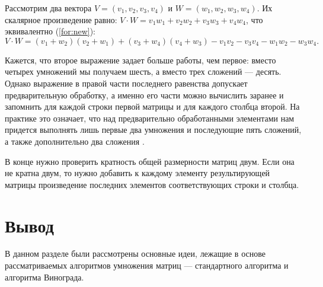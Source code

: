 Рассмотрим два вектора $V = (v_1, v_2, v_3, v_4)$ и $W = (w_1, w_2, w_3, w_4)$.
Их скалярное произведение равно: $V \cdot W = v_1w_1 + v_2w_2 + v_3w_3 + v_4w_4$, что эквивалентно (\ref{for:new}):
\begin{equation}
	\label{for:new}
	V \cdot W = (v_1 + w_2)(v_2 + w_1) + (v_3 + w_4)(v_4 + w_3) - v_1v_2 - v_3v_4 - w_1w_2 - w_3w_4.
\end{equation}

Кажется, что второе выражение задает больше работы, чем первое: вместо четырех умножений мы получаем шесть, а вместо трех сложений --- десять. Однако выражение в правой части последнего равенства допускает предварительную обработку, а именно его части можно вычислить заранее и запомнить для каждой строки первой матрицы и для каждого столбца второй. На практике это означает, что над предварительно обработанными элементами нам придется выполнять лишь первые два умножения и последующие пять сложений, а также дополнительно два сложения \cite{vinograd}.

В конце нужно проверить кратность общей размерности матриц двум. Если она не кратна двум, то нужно добавить к каждому элементу результирующей матрицы произведение последних элементов соответствующих  строки и столбца.


\section*{Вывод}
В данном разделе были рассмотрены основные идеи, лежащие в основе рассматриваемых алгоритмов умножения матриц --- стандартного алгоритма и алгоритма Винограда.
